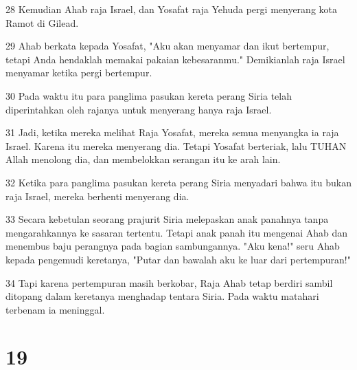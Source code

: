 \par 28 Kemudian Ahab raja Israel, dan Yosafat raja Yehuda pergi menyerang kota Ramot di Gilead.
\par 29 Ahab berkata kepada Yosafat, "Aku akan menyamar dan ikut bertempur, tetapi Anda hendaklah memakai pakaian kebesaranmu." Demikianlah raja Israel menyamar ketika pergi bertempur.
\par 30 Pada waktu itu para panglima pasukan kereta perang Siria telah diperintahkan oleh rajanya untuk menyerang hanya raja Israel.
\par 31 Jadi, ketika mereka melihat Raja Yosafat, mereka semua menyangka ia raja Israel. Karena itu mereka menyerang dia. Tetapi Yosafat berteriak, lalu TUHAN Allah menolong dia, dan membelokkan serangan itu ke arah lain.
\par 32 Ketika para panglima pasukan kereta perang Siria menyadari bahwa itu bukan raja Israel, mereka berhenti menyerang dia.
\par 33 Secara kebetulan seorang prajurit Siria melepaskan anak panahnya tanpa mengarahkannya ke sasaran tertentu. Tetapi anak panah itu mengenai Ahab dan menembus baju perangnya pada bagian sambungannya. "Aku kena!" seru Ahab kepada pengemudi keretanya, "Putar dan bawalah aku ke luar dari pertempuran!"
\par 34 Tapi karena pertempuran masih berkobar, Raja Ahab tetap berdiri sambil ditopang dalam keretanya menghadap tentara Siria. Pada waktu matahari terbenam ia meninggal.

\chapter{19}

